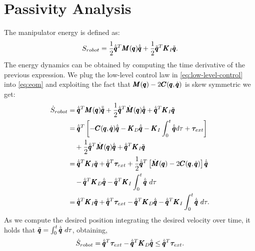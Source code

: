 \section{Passivity Analysis}\label{app:passivity_analysis}
The manipulator energy is defined as:
\begin{equation}
    S_{robot} = \frac{1}{2} \dot{\tilde{\pmb{q}}}^T \pmb{M}(\pmb{q}) \dot{\tilde{\pmb{q}}} + \frac{1}{2} \tilde{\pmb{q}}^T \pmb{K}_I \tilde{\pmb{q}}.
\end{equation}
The energy dynamics can be obtained by computing the time derivative of the previous expression. We plug the low-level control law in \eqref{eq:low-level-control} into \eqref{eq:eom} and exploiting the fact that $\pmb{M}(\pmb{q}) - 2 \pmb{C}(\pmb{q}, \dot{\pmb{q}})$ is skew symmetric we get:
\begin{equation}
\begin{aligned}
    \dot{S}_{robot} &= \dot{\tilde{\pmb{q}}}^T \pmb{M}(\pmb{q}) \ddot{\tilde{\pmb{q}}} + \frac{1}{2} \dot{\tilde{\pmb{q}}}^T \dot{\pmb{M}}(\pmb{q}) \dot{\tilde{\pmb{q}}} + \dot{\tilde{\pmb{q}}}^T \pmb{K}_I \tilde{\pmb{q}} \\
    &= \dot{\tilde{\pmb{q}}}^T \left[ -\pmb{C}(\pmb{q}, \dot{\pmb{q}}) \dot{\tilde{\pmb{q}}} -  \pmb{K}_D \dot{\tilde{\pmb{q}}} - \pmb{K}_I \int_{0}^{t} \dot{\tilde{\pmb{q}}} d\tau + \boldsymbol{\tau}_{ext} \right] \\
    &\quad + \frac{1}{2} \dot{\tilde{\pmb{q}}}^T \dot{\pmb{M}}(\pmb{q}) \dot{\tilde{\pmb{q}}} + \dot{\tilde{\pmb{q}}}^T \pmb{K}_I \tilde{\pmb{q}} \\
    &= \dot{\tilde{\pmb{q}}}^T \pmb{K}_I \tilde{\pmb{q}} + \dot{\tilde{\pmb{q}}}^T \boldsymbol{\tau}_{ext} + \frac{1}{2} \dot{\tilde{\pmb{q}}}^T\left[ \dot{\pmb{M}}(\pmb{q}) - 2\pmb{C}(\pmb{q}, \dot{\pmb{q}}) \right] \dot{\tilde{\pmb{q}}} \\
    &\quad - \dot{\tilde{\pmb{q}}}^T \pmb{K}_D \dot{\tilde{\pmb{q}}}  - \dot{\tilde{\pmb{q}}}^T \pmb{K}_I \int^{t}_{0} \dot{\tilde{\pmb{q}}}\ d\tau\\
    &= \dot{\tilde{\pmb{q}}}^T \pmb{K}_I \tilde{\pmb{q}} + \dot{\tilde{\pmb{q}}}^T \boldsymbol{\tau}_{ext} - \dot{\tilde{\pmb{q}}}^T \pmb{K}_D \dot{\tilde{\pmb{q}}} -  \dot{\tilde{\pmb{q}}}^T \pmb{K}_I \int^{t}_{0} \dot{\tilde{\pmb{q}}}\ d\tau.  
\end{aligned}
\end{equation}
As we compute the desired position integrating the desired velocity over time, it holds that $\tilde{\pmb{q}} = \int^{t}_{0}
\dot{\tilde{\pmb{q}}}\ d\tau$, obtaining,
\begin{equation}
    \dot{S}_{robot} = \dot{\tilde{\pmb{q}}}^T \boldsymbol{\tau}_{ext} - \dot{\tilde{\pmb{q}}}^T \pmb{K}_D \dot{\tilde{\pmb{q}}} \leq \dot{\tilde{\pmb{q}}}^T \boldsymbol{\tau}_{ext}. 
\end{equation}

